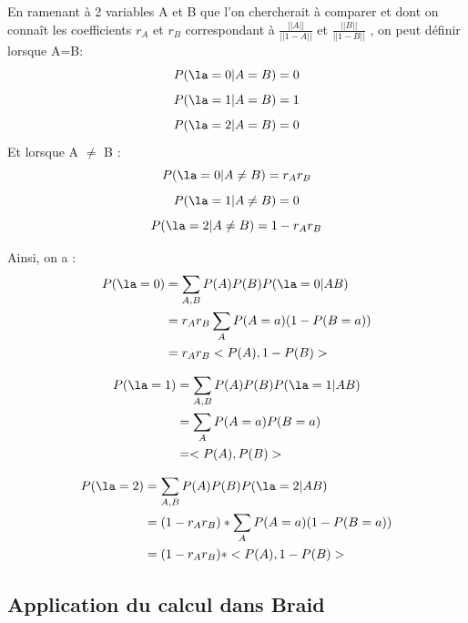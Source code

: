 \documentclass{article}
\begin{document}
    En ramenant à 2 variables A et B que l'on chercherait à comparer et dont on connaît les coefficients $r_A$ et $r_B$ correspondant à $\frac{||A||}{||1-A||}$ et $\frac{||B||}{||1-B||}$ , on peut définir lorsque A=B:
    $$ P(\la = 0 |A=B)=0$$
    $$ P(\la = 1 |A=B)=1$$
    $$ P(\la = 2 |A=B)=0 $$
    Et lorsque A $\neq$ B : 
    $$ P(\la = 0 |A\neq B)=r_Ar_B$$
    $$ P(\la = 1 |A\neq B)=0$$
    $$ P(\la = 2 |A\neq B)=1-r_Ar_B$$
    
    Ainsi, on a :\\
\begin{align*}
P(\la =0) &=  \sum_{A,B}P(A)P(B)P(\la =0|AB) \\
  &= r_Ar_B \sum_{A}P(A=a) (1-P(B=a))\\
 &= r_Ar_B<P(A),1-P(B)> \\
 \end{align*}
 
\begin{align*}
P(\la =1) &=  \sum_{A,B}P(A)P(B)P(\la =1|AB) \\
  &= \sum_{A}P(A=a) P(B=a)\\
 &=<P(A),P(B)> \\
 \end{align*}
 
\begin{align*}
P(\la =2) &=  \sum_{A,B}P(A)P(B)P(\la =2|AB) \\
  &=(1-r_Ar_B)* \sum_{A}P(A=a)(1-P(B=a))\\
 &=(1-r_Ar_B)* <P(A),1-P(B)> \\
 \end{align*}
 
 
\subsection{Application du calcul dans Braid}
    
\end{document}
